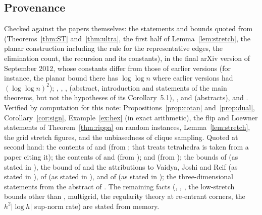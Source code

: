 \documentclass[11pt]{amsart}
\theoremstyle{definition}
\theoremstyle{remark}
\begin{document}
\subsection*{Provenance}
Checked against the papers themselves: the statements and bounds quoted from \cite{STsolve} (Theorems~\ref{thm:ST} and~\ref{thm:ultra}, the first half of Lemma~\ref{lem:stretch}, the planar construction including the rule for the representative edges, the elimination count, the recursion and its constants),
in the final arXiv version of September 2012, whose constants differ from those of earlier versions (for instance, the planar bound there has $\log\log n$ where earlier versions had $(\log\log n)^2$); \cite{KOSZ13}, \cite{KS16}, \cite{GJN20},
\cite{Sko13} (abstract, introduction and statements of the main theorems, but not the hypotheses of its Corollary~5.1), \cite{BS07}, \cite{JS21} and \cite{GKS23} (abstracts), and \cite{Cra19}.
Verified by computation for this note: Propositions~\ref{prop:cotan} and~\ref{prop:dual}, Corollary~\ref{cor:sign}, Example~\ref{ex:hex} (in exact arithmetic), the flip and Loewner statements of Theorem~\ref{thm:rippa} on random instances,
Lemma~\ref{lem:stretch}, the grid stretch figures, and the unbiasedness of clique sampling.
Quoted at second hand: the contents of \cite{Duf59} and \cite{Mac49} (from \cite{Cra19}; that \cite{Duf59} treats tetrahedra is taken from a paper citing it); the contents of \cite{Duf68} and \cite{Wer15} (from \cite{GJN20}); \cite{Rip90} and \cite{CR73} (from \cite{BS07,Sko13,GJN20}); the bounds of \cite{KMP10,KMP11} (as stated in \cite{KOSZ13,STsolve}), the bound of \cite{SW09} and the attributions to Vaidya, Joshi and Reif (as stated in \cite{STsolve}),
of \cite{CKMPPRX14} (as stated in \cite{KS16,JS21}), and of \cite{KM07} (as stated in \cite{STsolve}); the three-dimensional statements from the abstract of \cite{PC98}.
The remaining facts (\cite{BA76}, \cite{BHV08}, \cite{ST96}, the low-stretch bounds other than \cite{AN12,ABN08}, multigrid, the regularity theory at re-entrant corners, the $h^2|\log h|$ sup-norm rate) are stated from memory.
\end{document}
